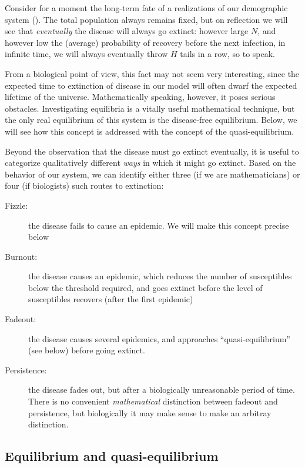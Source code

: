 \documentclass{amsproc}
\theoremstyle{definition}
\theoremstyle{remark}
\numberwithin{equation}{section}
\begin{document}
Consider for a moment the long-term fate of a realizations of our demographic system ().  The total population always remains fixed, but on reflection we will see that {\em eventually} the disease will always go extinct: however large $N$, and however low the (average) probability of recovery before the next infection, in infinite time, we will always eventually throw $H$ tails in a row, so to speak.  

From a biological point of view, this fact may not seem very interesting, since the expected time to extinction of disease in our model will often dwarf the expected lifetime of the universe.  Mathematically speaking, however, it poses serious obstacles.  Investigating equilibria is a vitally useful mathematical technique, but the only real equilibrium of this system is the disease-free equilibrium.  Below, we will see how this concept is addressed with the concept of the quasi-equilibrium.

Beyond the observation that the disease must go extinct eventually, it is useful to categorize qualitatively different {\em ways} in which it might go extinct.  Based on the behavior of our system, we can identify either three (if we are mathematicians) or four (if biologists) such routes to extinction:

\begin{description}

	\item [Fizzle:] the disease fails to cause an epidemic.  We will make this concept precise below

	\item [Burnout:] the disease causes an epidemic, which reduces the number of susceptibles below the threshold required, and goes extinct before the level of susceptibles recovers (after the first epidemic)

	\item [Fadeout:] the disease causes several epidemics, and approaches ``quasi-equilibrium'' (see below) before going extinct.

	\item [Persistence:] the disease fades out, but after a biologically unreasonable period of time.  
	There is no convenient {\em mathematical} distinction between fadeout and persistence, but biologically it may make sense to make an arbitray distinction.

\end{description}

\subsection{Equilibrium and quasi-equilibrium }
\end{document}
